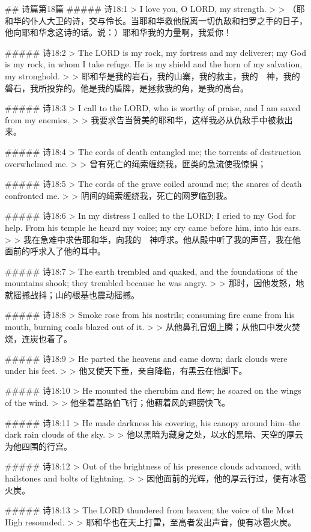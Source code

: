 ## 诗篇第18篇
##### 诗18:1
> I love you, O LORD, my strength.
>
> （耶和华的仆人大卫的诗，交与伶长。当耶和华救他脱离一切仇敌和扫罗之手的日子，他向耶和华念这诗的话。说：）耶和华我的力量啊，我爱你！


##### 诗18:2
> The LORD is my rock, my fortress and my deliverer; my God is my rock, in whom I take refuge. He is my shield and the horn of my salvation, my stronghold.
>
> 耶和华是我的岩石，我的山寨，我的救主，我的　神，我的磐石，我所投靠的。他是我的盾牌，是拯救我的角，是我的高台。


##### 诗18:3
> I call to the LORD, who is worthy of praise, and I am saved from my enemies.
>
> 我要求告当赞美的耶和华，这样我必从仇敌手中被救出来。


##### 诗18:4
> The cords of death entangled me; the torrents of destruction overwhelmed me.
>
> 曾有死亡的绳索缠绕我，匪类的急流使我惊惧；


##### 诗18:5
> The cords of the grave coiled around me; the snares of death confronted me.
>
> 阴间的绳索缠绕我，死亡的网罗临到我。


##### 诗18:6
> In my distress I called to the LORD; I cried to my God for help. From his temple he heard my voice; my cry came before him, into his ears.
>
> 我在急难中求告耶和华，向我的　神呼求。他从殿中听了我的声音，我在他面前的呼求入了他的耳中。


##### 诗18:7
> The earth trembled and quaked, and the foundations of the mountains shook; they trembled because he was angry.
>
> 那时，因他发怒，地就摇撼战抖；山的根基也震动摇撼。


##### 诗18:8
> Smoke rose from his nostrils; consuming fire came from his mouth, burning coals blazed out of it.
>
> 从他鼻孔冒烟上腾；从他口中发火焚烧，连炭也着了。


##### 诗18:9
> He parted the heavens and came down; dark clouds were under his feet.
>
> 他又使天下垂，亲自降临，有黑云在他脚下。


##### 诗18:10
> He mounted the cherubim and flew; he soared on the wings of the wind.
>
> 他坐着基路伯飞行；他藉着风的翅膀快飞。


##### 诗18:11
> He made darkness his covering, his canopy around him--the dark rain clouds of the sky.
>
> 他以黑暗为藏身之处，以水的黑暗、天空的厚云为他四围的行宫。


##### 诗18:12
> Out of the brightness of his presence clouds advanced, with hailstones and bolts of lightning.
>
> 因他面前的光辉，他的厚云行过，便有冰雹火炭。


##### 诗18:13
> The LORD thundered from heaven; the voice of the Most High resounded.
>
> 耶和华也在天上打雷，至高者发出声音，便有冰雹火炭。


